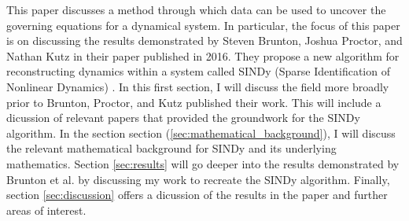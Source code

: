 \documentclass[10pt]{paper}
\begin{document}
This paper discusses a method through which data can be used to uncover the governing equations for a dynamical system. 
%
In particular, the focus of this paper is on discussing the results demonstrated by Steven Brunton, Joshua Proctor, and Nathan Kutz in their paper published in 2016. They propose a new algorithm for reconstructing dynamics within a system called SINDy (Sparse Identification of Nonlinear Dynamics) \cite{sindy}.
In this first section, I will discuss the field more broadly prior to Brunton, Proctor, and Kutz published their work. This will include a dicussion of relevant papers that provided the groundwork for the SINDy algorithm.
In the section section (\ref{sec:mathematical_background}), I will discuss the relevant mathematical background for SINDy and its underlying mathematics. Section \ref{sec:results} will go deeper into the results demonstrated by Brunton et al. by discussing my work to recreate the SINDy algorithm. 
Finally, section \ref{sec:discussion} offers a dicussion of the results in the paper and further areas of interest. 
\end{document}
